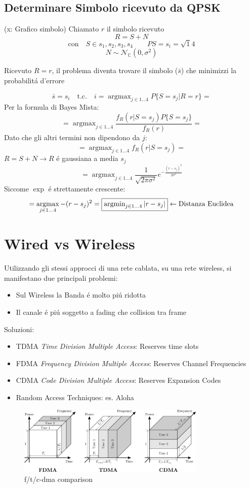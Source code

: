 \documentclass{article}
\DeclareMathOperator*{\argmax}{argmax}
\DeclareMathOperator*{\argmin}{argmin}
\begin{document}
\subsection{Determinare Simbolo ricevuto da QPSK}
(x: Grafico simbolo)
Chiamato $r$ il simbolo ricevuto
\[ R = S+N \]
\[ \text{con} \quad S \in {s_1, s_2, s_3, s_4 } \qquad P{S = s_i} = \sqrt{1}{4}\]
\[ N \sim \mathcal{N}_{\mathbb{C}}(0, \sigma^2)\]

Ricevuto $R=r$, il problema diventa trovare il simbolo ($\bar{s}$) che minimizzi la probabilit\'a d'errore

\[ \bar{s} = s_i \quad \text{t.c.} \quad i = \argmax_{j \in 1\ldots 4} P\{ S=s_j \big| R=r\}  = \]
Per la formula di Bayes Mista:
\[= \argmax_{j \in 1\ldots 4} \frac{f_R(r | S=s_j) P\{ S=s_j\}}{f_R(r)} =\]
Dato che gli altri termini non dipendono da $j$:
\[= \argmax_{j \in 1\ldots 4} f_R(r|S=s_j) =\]
$R = S+N \rightarrow R$ \'e gaussiana a media $s_j$
\[ = \argmax_{j \in 1\ldots 4} \frac{1}{\sqrt{2\pi\sigma^2}} e^{-\frac{(r - s_j)^2}{2\sigma^2}} \]
Siccome $\exp$ \'e strettamente crescente:
\[= \argmax_{j \in 1\ldots 4} -(r - s_j)^2 = \framebox{$\argmin_{j \in 1 \ldots 4} | r - s_j |$} \leftarrow\text{Distanza Euclidea}\]

\section{Wired vs Wireless}
Utilizzando gli stessi approcci di una rete cablata, su una rete wireless, si manifestano due principali problemi:
\begin{itemize}
    \item Sul Wireless la Banda \'e molto pi\'u ridotta
    \item Il canale \'e pi\'u soggetto a fading che collision tra frame
\end{itemize}

Soluzioni:
\begin{itemize}
    \item TDMA \textit{Time Division Multiple Access}: Reserves time slots
    \item FDMA \textit{Frequency Division Multiple Access}: Reserves Channel Frequencies
    \item CDMA \textit{Code Division Multiple Access}: Reserves Expansion Codes
    \item Random Access Techniques: es. Aloha
\end{itemize}

\begin{figure}[h]
    \includegraphics[width=0.8\textwidth]{img/sdt/comp_ftcdma}
    \centering
    \caption{f/t/c-dma comparison}
\end{figure}
\end{document}
